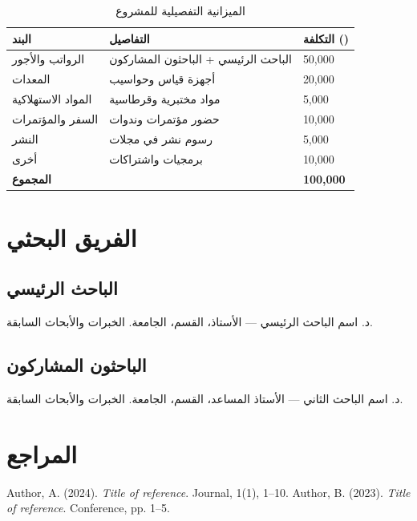 \documentclass[11pt,a4paper]{article}
\begin{document}
\begin{table}[H]
\centering
\caption{الميزانية التفصيلية للمشروع}
\begin{tabularx}{\textwidth}{L{5cm} X R{3cm}}
\toprule
\textbf{البند} & \textbf{التفاصيل} & \textbf{التكلفة ()} \\
\midrule
الرواتب والأجور & الباحث الرئيسي + الباحثون المشاركون & 50,000 \\
المعدات & أجهزة قياس وحواسيب & 20,000 \\
المواد الاستهلاكية & مواد مختبرية وقرطاسية & 5,000 \\
السفر والمؤتمرات & حضور مؤتمرات وندوات & 10,000 \\
النشر & رسوم نشر في مجلات & 5,000 \\
أخرى & برمجيات واشتراكات & 10,000 \\
\midrule
\textbf{المجموع} & & \textbf{100,000} \\
\bottomrule
\end{tabularx}
\end{table}

\section{الفريق البحثي}
\label{sec:team}

\subsection{الباحث الرئيسي}
د. اسم الباحث الرئيسي — الأستاذ، القسم، الجامعة. الخبرات والأبحاث السابقة.

\subsection{الباحثون المشاركون}
د. اسم الباحث الثاني — الأستاذ المساعد، القسم، الجامعة. الخبرات والأبحاث السابقة.

\section{المراجع}
\label{sec:references}

\begin{thebibliography}{99}
 Author, A. (2024). \emph{Title of reference}. Journal, 1(1), 1--10.
 Author, B. (2023). \emph{Title of reference}. Conference, pp. 1--5.
\end{thebibliography}

\printglossaries
\end{document}
